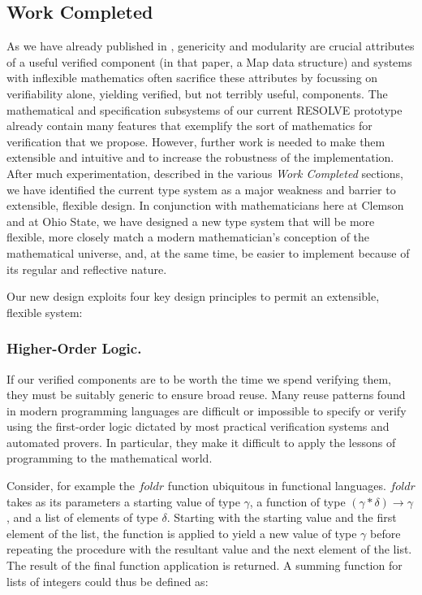 \subsection{Work Completed}
As we have already published in \cite{bronishMap}, genericity and modularity are crucial attributes of a useful verified component (in that paper, a Map data structure) and systems with inflexible mathematics often sacrifice these attributes by focussing on verifiability alone, yielding verified, but not terribly useful, components.  The mathematical and specification subsystems of our current RESOLVE prototype already contain many features that exemplify the sort of mathematics for verification that we propose.  However, further work is needed to make them extensible and intuitive and to increase the robustness of the implementation.  After much experimentation, described in the various \emph{Work Completed} sections, we have identified the current type system as a major weakness and barrier to extensible, flexible design.  In conjunction with mathematicians here at Clemson and at Ohio State, we have designed a new type system that will be more flexible, more closely match a modern mathematician's conception of the mathematical universe, and, at the same time, be easier to implement because of its regular and reflective nature.

Our new design exploits four key design principles to permit an extensible, flexible system:

\subsubsection{Higher-Order Logic.}\label{sec:higherOrderDefinitions}
If our verified components are to be worth the time we spend verifying them, they must be suitably generic to ensure broad reuse.  Many reuse patterns found in modern programming languages are difficult or impossible to specify or verify using the first-order logic dictated by most practical verification systems and automated provers.  In particular, they make it difficult to apply the lessons of programming to the mathematical world.

Consider, for example the $foldr$ function ubiquitous in functional languages.  $foldr$ takes as its parameters a starting value of type $\gamma$, a function of type $(\gamma*\delta)\rightarrow\gamma$, and a list of elements of type $\delta$.  Starting with the starting value and the first element of the list, the function is applied to yield a new value of type $\gamma$ before repeating the procedure with the resultant value and the next element of the list.  The result of the final function application is returned.  A summing function for lists of integers could thus be defined as:

